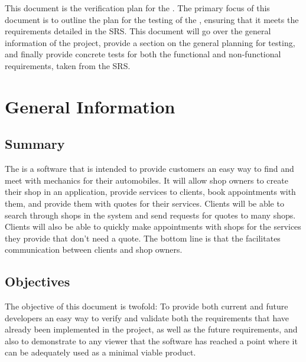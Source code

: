 \documentclass[12pt, titlepage]{article}
\begin{document}

This document is the verification plan for the \progname{}. The primary focus of this document is to outline the plan for the testing of the \progname{}, ensuring that it meets the requirements detailed in the SRS. This document will go over the general information of the project, provide a section on the general planning for testing, and finally provide concrete tests for both the functional and non-functional requirements, taken from the SRS. 

\section{General Information}

\subsection{Summary}

The \progname{} is a software that is intended to provide customers an easy way to find and meet with mechanics for their automobiles. It will allow shop owners to create their shop in an application, provide services to clients, book appointments with them, and provide them with quotes for their services. Clients will be able to search through shops in the system and send requests for quotes to many shops. Clients will also be able to quickly make appointments with shops for the services they provide that don't need a quote. The bottom line is that the \progname{} facilitates communication between clients and shop owners.

\subsection{Objectives}

The objective of this document is twofold: To provide both current and future developers an easy way to verify and validate both the requirements that have already been implemented in the project, as well as the future requirements, and also to demonstrate to any viewer that the software has reached a point where it can be adequately used as a minimal viable product.
\end{document}
